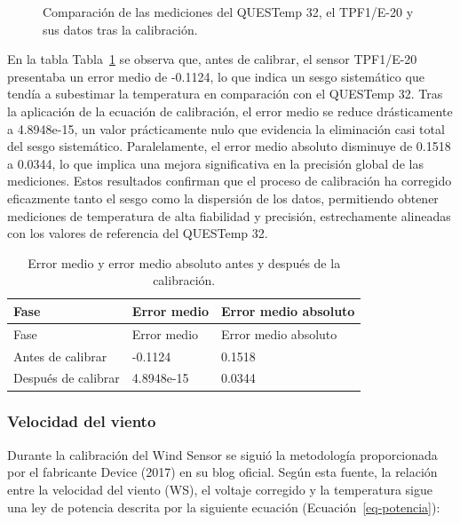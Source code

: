 \documentclass[
  letterpaper,
]{scrbook}
\begin{document}
\begin{figure}


\caption{\label{fig-cradiante}Comparación de las mediciones del QUESTemp
32, el TPF1/E-20 y sus datos tras la calibración.}

\end{figure}%

En la tabla Tabla~\ref{tbl-error-rad} se observa que, antes de calibrar,
el sensor TPF1/E-20 presentaba un error medio de -0.1124, lo que indica
un sesgo sistemático que tendía a subestimar la temperatura en
comparación con el QUESTemp 32. Tras la aplicación de la ecuación de
calibración, el error medio se reduce drásticamente a 4.8948e-15, un
valor prácticamente nulo que evidencia la eliminación casi total del
sesgo sistemático. Paralelamente, el error medio absoluto disminuye de
0.1518 a 0.0344, lo que implica una mejora significativa en la precisión
global de las mediciones. Estos resultados confirman que el proceso de
calibración ha corregido eficazmente tanto el sesgo como la dispersión
de los datos, permitiendo obtener mediciones de temperatura de alta
fiabilidad y precisión, estrechamente alineadas con los valores de
referencia del QUESTemp 32.

\begin{longtable}[]{@{}lll@{}}
\caption{Error medio y error medio absoluto antes y después de la
calibración.}\label{tbl-error-rad}\tabularnewline
\toprule\noalign{}
Fase & Error medio & Error medio absoluto \\
\midrule\noalign{}
\endfirsthead
\toprule\noalign{}
Fase & Error medio & Error medio absoluto \\
\midrule\noalign{}
\endhead
\bottomrule\noalign{}
\endlastfoot
Antes de calibrar & -0.1124 & 0.1518 \\
Después de calibrar & 4.8948e-15 & 0.0344 \\
\end{longtable}

\subsubsection{Velocidad del viento}\label{velocidad-del-viento-1}

Durante la calibración del Wind Sensor se siguió la metodología
proporcionada por el fabricante Device (2017) en su blog oficial. Según
esta fuente, la relación entre la velocidad del viento (WS), el voltaje
corregido y la temperatura sigue una ley de potencia descrita por la
siguiente ecuación (Ecuación~\ref{eq-potencia}):
\end{document}
